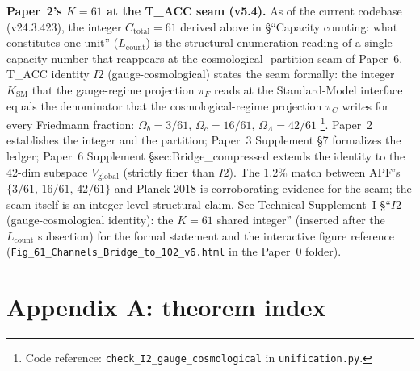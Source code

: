 \documentclass[11pt]{article}
\newcommand{\coderef}[2]{\footnote{Code reference: \texttt{#1} in \texttt{#2}.}}
\begin{document}
\smallskip\noindent\textbf{Paper~2's $K = 61$ at the T\_ACC seam
(v5.4).}
As of the current codebase (v24.3.423), the integer $C_{\mathrm{total}} = 61$ derived
above in \S``Capacity counting: what constitutes one unit''
($L_{\mathrm{count}}$) is the structural-enumeration
reading of a single capacity number that reappears at the cosmological-
partition seam of Paper~6.  T\_ACC identity $I2$ (gauge-cosmological)
states the seam formally: the integer $K_{\mathrm{SM}}$ that the
gauge-regime projection $\pi_F$ reads at the Standard-Model interface
equals the denominator that the cosmological-regime projection
$\pi_C$ writes for every Friedmann fraction:
$\Omega_b = 3/61$, $\Omega_c = 16/61$, $\Omega_\Lambda = 42/61$
\coderef{check\_I2\_gauge\_cosmological}{unification.py}.  Paper~2
establishes the integer and the partition; Paper~3 Supplement \S 7
formalizes the ledger; Paper~6 Supplement \S sec:Bridge\_compressed
extends the identity to the $42$-dim subspace $V_{\mathrm{global}}$
(strictly finer than $I2$).  The $1.2\%$ match between APF's
$\{3/61,\,16/61,\,42/61\}$ and Planck 2018 is corroborating evidence
for the seam; the seam itself is an integer-level structural claim.
See Technical Supplement~I \S``$I2$ (gauge-cosmological identity):
the $K = 61$ shared integer'' (inserted after the $L_{\mathrm{count}}$
subsection) for the formal statement and the interactive figure
reference (\texttt{Fig\_61\_Channels\_Bridge\_to\_102\_v6.html} in
the Paper~0 folder).


\section{Appendix A: theorem index}
\label{app:theorems}
\end{document}
